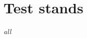 \documentclass[11pt, a4paper]{book}
\begin{document}

\chapter{Test stands}
\label{chapter:teststands}
{\it all} 



\clearpage
{}





\end{document}
